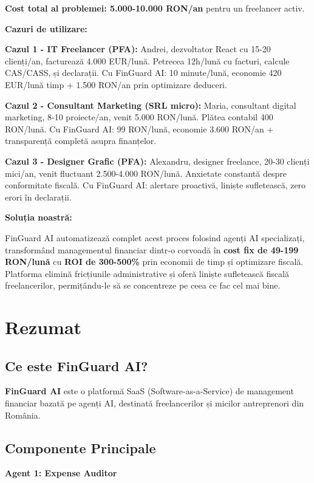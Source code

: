 \documentclass[11pt,a4paper]{article}
\begin{document}
\textbf{Cost total al problemei: 5.000-10.000 RON/an} pentru un freelancer activ.

\textbf{Cazuri de utilizare:}

\textbf{Cazul 1 - IT Freelancer (PFA):} Andrei, dezvoltator React cu 15-20 clienți/an, facturează 4.000 EUR/lună. Petrecea 12h/lună cu facturi, calcule CAS/CASS, și declarații. Cu FinGuard AI: 10 minute/lună, economie 420 EUR/lună timp + 1.500 RON/an prin optimizare deduceri.

\textbf{Cazul 2 - Consultant Marketing (SRL micro):} Maria, consultant digital marketing, 8-10 proiecte/an, venit 5.000 RON/lună. Plătea contabil 400 RON/lună. Cu FinGuard AI: 99 RON/lună, economie 3.600 RON/an + transparență completă asupra finanțelor.

\textbf{Cazul 3 - Designer Grafic (PFA):} Alexandru, designer freelance, 20-30 clienți mici/an, venit fluctuant 2.500-4.000 RON/lună. Anxietate constantă despre conformitate fiscală. Cu FinGuard AI: alertare proactivă, liniște sufletească, zero erori în declarații.

\textbf{Soluția noastră:}

FinGuard AI automatizează complet acest proces folosind agenți AI specializați, transformând managementul financiar dintr-o corvoadă în \textbf{cost fix de 49-199 RON/lună} cu \textbf{ROI de 300-500\%} prin economii de timp și optimizare fiscală. Platforma elimină fricțiunile administrative și oferă liniște sufletească fiscală freelancerilor, permițându-le să se concentreze pe ceea ce fac cel mai bine.

\section{Rezumat}

\subsection{Ce este FinGuard AI?}

\textbf{FinGuard AI} este o platformă SaaS (Software-as-a-Service) de management financiar bazată pe agenți AI, destinată freelancerilor și micilor antreprenori din România.

\subsection{Componente Principale}

\textbf{Agent 1: Expense Auditor}
\end{document}

